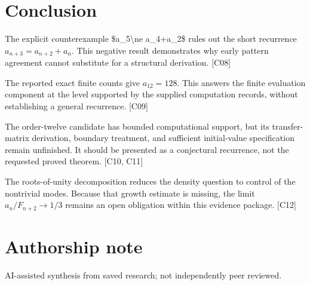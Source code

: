 \documentclass[11pt]{article}
\begin{document}
\section{Conclusion}
The explicit counterexample \$a\_5\textbackslash{}ne a\_4+a\_2\$ rules out the short recurrence $a_{n+3}=a_{n+2}+a_n$. This negative result demonstrates why early pattern agreement cannot substitute for a structural derivation. [C08]

The reported exact finite counts give $a_{12}=128$. This answers the finite evaluation component at the level supported by the supplied computation records, without establishing a general recurrence. [C09]

The order-twelve candidate has bounded computational support, but its transfer-matrix derivation, boundary treatment, and sufficient initial-value specification remain unfinished. It should be presented as a conjectural recurrence, not the requested proved theorem. [C10, C11]

The roots-of-unity decomposition reduces the density question to control of the nontrivial modes. Because that growth estimate is missing, the limit $a_n/F_{n+2}\to1/3$ remains an open obligation within this evidence package. [C12]

\section*{Authorship note}
AI-assisted synthesis from saved research; not independently peer reviewed.
\end{document}

